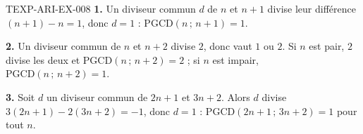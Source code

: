 \begin{corrige}{TEXP-ARI-EX-008}
\textbf{1.} Un diviseur commun $d$ de $n$ et $n+1$ divise leur différence
$(n+1)-n=1$, donc $d=1$ : $\mathrm{PGCD}(n\,;\,n+1)=1$.

\textbf{2.} Un diviseur commun de $n$ et $n+2$ divise $2$, donc vaut $1$ ou
$2$. Si $n$ est pair, $2$ divise les deux et
$\mathrm{PGCD}(n\,;\,n+2)=2$ ; si $n$ est impair, $\mathrm{PGCD}(n\,;\,n+2)=1$.

\textbf{3.} Soit $d$ un diviseur commun de $2n+1$ et $3n+2$. Alors $d$ divise
$3(2n+1)-2(3n+2)=-1$, donc $d=1$ : $\mathrm{PGCD}(2n+1\,;\,3n+2)=1$ pour tout
$n$.
\end{corrige}
